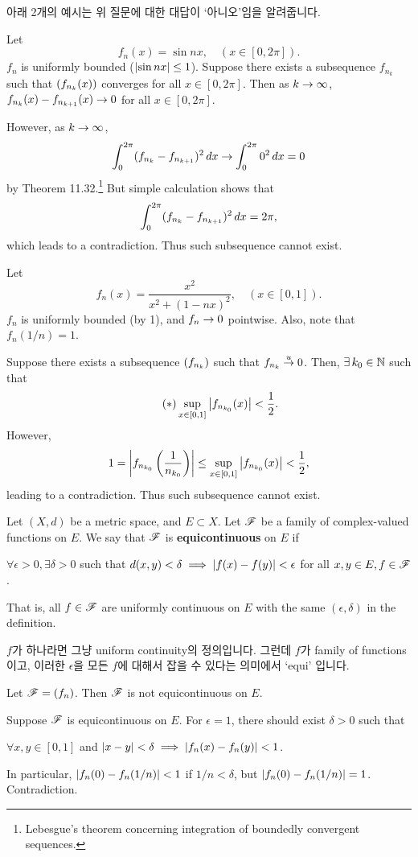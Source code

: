 아래 2개의 예시는 위 질문에 대한 대답이 `아니오'임을 알려줍니다.

 Let
\[
    f_n(x) = \sin nx, \quad (x \in [0, 2\pi]).
\]
\(f_n\) is uniformly bounded (\(\left| \sin nx \right| \leq 1\)). Suppose there exists a subsequence \(f_{n_k}\) such that \(\left( f_{n_k}(x) \right)\) converges for all \(x \in [0, 2\pi]\). Then as \(k\rightarrow\infty\), \(f_{n_k}(x) - f_{n_{k+1}}(x) \rightarrow 0\) for all \(x \in [0, 2\pi]\).

However, as \(k \rightarrow \infty\),
\[
    \int_0^{2\pi} (f_{n_k} - f_{n_{k+1}})^2 \,d{x} \rightarrow \int_0^{2\pi} 0^2 \,d{x} = 0
\]
by Theorem 11.32.\footnote{Lebesgue's theorem concerning integration of boundedly convergent sequences.} But simple calculation shows that
\[
    \int_0^{2\pi} (f_{n_k} - f_{n_{k+1}})^2 \,d{x} = 2\pi,
\]
which leads to a contradiction. Thus such subsequence cannot exist.

 Let
\[
    f_n(x) = \frac{x^2}{x^2 + (1-nx)^2}, \quad (x\in [0, 1]).
\]
\(f_n\) is uniformly bounded (by 1), and \(f_n \rightarrow 0\) pointwise. Also, note that \(f_n(1/n) = 1\).

Suppose there exists a subsequence \(\left( f_{n_k} \right)\) such that \(f_{n_k} \overset{u}{\rightarrow} 0\). Then, \(\exists k_0 \in \N\) such that
\[ \tag{\mast}
    \sup_{x \in [0, 1]} \abs{f_{n_{k_0}}(x)} < \frac{1}{2}.
\]
However,
\[
    1 = \left| f_{n_{k_0}}\left(\frac{1}{n_{k_0}}\right) \right| \leq \sup_{x \in [0, 1]} \left| f_{n_{k_0}}(x) \right| < \frac{1}{2},
\]
leading to a contradiction. Thus such subsequence cannot exist.

  Let \((X, d)\) be a metric space, and \(E \subset X\). Let \(\mathscr{F}\) be a family of complex-valued functions on \(E\). We say that \(\mathscr{F}\) is \textbf{equicontinuous} on \(E\) if
\begin{center}
    \(\forall \epsilon > 0, \exists \delta > 0\) such that \(d(x, y) < \delta \implies \left| f(x) - f(y) \right| < \epsilon\) for all \(x, y \in E, f\in \mathscr{F}\).
\end{center}
That is, all \(f \in \mathscr{F}\) are uniformly continuous on \(E\) with the same \((\epsilon, \delta)\) in the definition.

\(f\)가 하나라면 그냥 uniform continuity의 정의입니다. 그런데 \(f\)가 family of functions이고, 이러한 \(\epsilon\)을 모든 \(f\)에 대해서 잡을 수 있다는 의미에서 `equi' 입니다.

\rmk {} Let \(\mathscr{F} = \left( f_n \right)\). Then \(\mathscr{F}\) is not equicontinuous on \(E\).

\pf Suppose \(\mathscr{F}\) is equicontinuous on \(E\). For \(\epsilon = 1\), there should exist \(\delta > 0\) such that
\begin{center}
    \(\forall x, y \in [0, 1]\) and \(\left| x - y \right| < \delta \implies \left| f_n(x) - f_n(y) \right| < 1\).
\end{center}
In particular, \(\left| f_n(0) - f_n(1/n) \right| < 1\) if \(1 / n < \delta\), but \(\left| f_n(0) - f_n(1/n) \right| = 1\). Contradiction.

